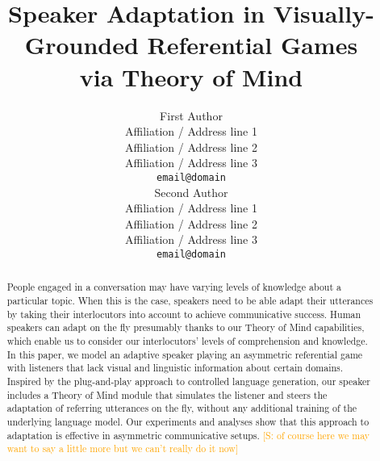 \documentclass[11pt]{article}
\title{Speaker Adaptation in Visually-Grounded Referential Games\\via Theory of Mind}
\author{First Author \\
  Affiliation / Address line 1 \\
  Affiliation / Address line 2 \\
  Affiliation / Address line 3 \\
  \texttt{email@domain} \\\And
  Second Author \\
  Affiliation / Address line 1 \\
  Affiliation / Address line 2 \\
  Affiliation / Address line 3 \\
  \texttt{email@domain} \\}
\newcommand{\san}[1]{\textcolor{orange}{[S: #1]}}
\begin{document}
\maketitle
\begin{abstract}


People engaged in a conversation may have varying levels of knowledge about a particular topic. When this is the case, speakers need to be able adapt their utterances by taking their interlocutors into account to achieve communicative success. Human speakers can adapt on the fly presumably thanks to our Theory of Mind capabilities, which
enable us to consider our interlocutors' levels of comprehension and knowledge. In this paper, we model an adaptive speaker playing an asymmetric referential game with listeners that lack visual and linguistic information about certain domains. Inspired by the plug-and-play approach to controlled language generation, our speaker includes a Theory of Mind module that simulates the listener and steers the adaptation of referring utterances on the fly, without any additional training of the underlying language model. Our experiments and analyses show that this approach to adaptation is effective in asymmetric communicative setups. \san{of course here we may want to say a little more but we can't really do it now}




\end{abstract}
\end{document}

